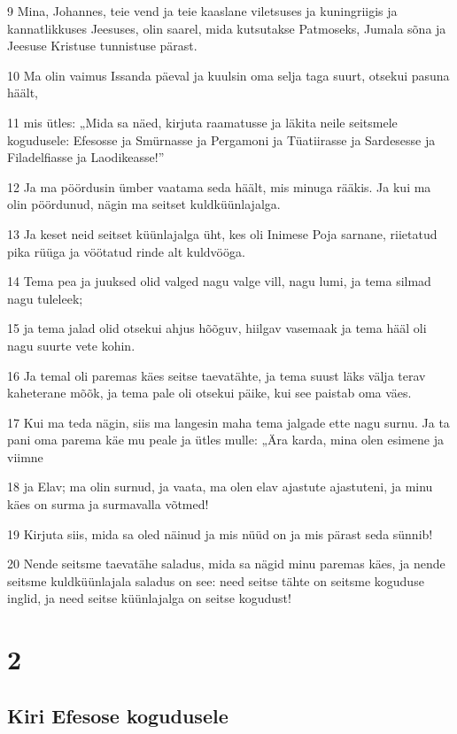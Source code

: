 \par 9 Mina, Johannes, teie vend ja teie kaaslane viletsuses ja kuningriigis ja kannatlikkuses Jeesuses, olin saarel, mida kutsutakse Patmoseks, Jumala sõna ja Jeesuse Kristuse tunnistuse pärast.
\par 10 Ma olin vaimus Issanda päeval ja kuulsin oma selja taga suurt, otsekui pasuna häält,
\par 11 mis ütles: „Mida sa näed, kirjuta raamatusse ja läkita neile seitsmele kogudusele: Efesosse ja Smürnasse ja Pergamoni ja Tüatiirasse ja Sardesesse ja Filadelfiasse ja Laodikeasse!”
\par 12 Ja ma pöördusin ümber vaatama seda häält, mis minuga rääkis. Ja kui ma olin pöördunud, nägin ma seitset kuldküünlajalga.
\par 13 Ja keset neid seitset küünlajalga üht, kes oli Inimese Poja sarnane, riietatud pika rüüga ja vöötatud rinde alt kuldvööga.
\par 14 Tema pea ja juuksed olid valged nagu valge vill, nagu lumi, ja tema silmad nagu tuleleek;
\par 15 ja tema jalad olid otsekui ahjus hõõguv, hiilgav vasemaak ja tema hääl oli nagu suurte vete kohin.
\par 16 Ja temal oli paremas käes seitse taevatähte, ja tema suust läks välja terav kaheterane mõõk, ja tema pale oli otsekui päike, kui see paistab oma väes.
\par 17 Kui ma teda nägin, siis ma langesin maha tema jalgade ette nagu surnu. Ja ta pani oma parema käe mu peale ja ütles mulle: „Ära karda, mina olen esimene ja viimne
\par 18 ja Elav; ma olin surnud, ja vaata, ma olen elav ajastute ajastuteni, ja minu käes on surma ja surmavalla võtmed!
\par 19 Kirjuta siis, mida sa oled näinud ja mis nüüd on ja mis pärast seda sünnib!
\par 20 Nende seitsme taevatähe saladus, mida sa nägid minu paremas käes, ja nende seitsme kuldküünlajala saladus on see: need seitse tähte on seitsme koguduse inglid, ja need seitse küünlajalga on seitse kogudust!


\chapter{2}

\section*{Kiri Efesose kogudusele}

